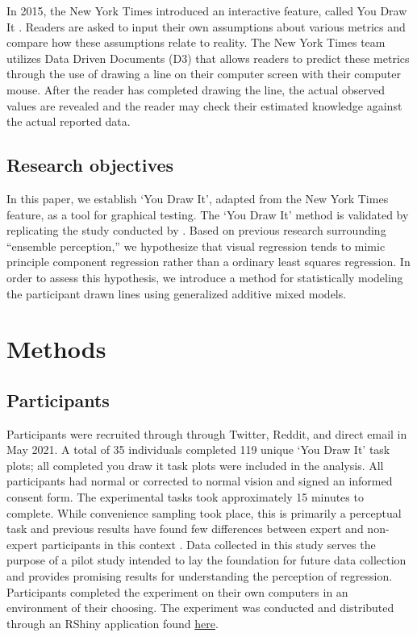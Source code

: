 \documentclass[12pt]{article}
\begin{document}
In 2015, the New York Times introduced an interactive feature, called
You Draw It
\citep{aisch_cox_quealy_2015, buchanan_park_pearce_2017, katz_2017}.
Readers are asked to input their own assumptions about various metrics
and compare how these assumptions relate to reality. The New York Times
team utilizes Data Driven Documents (D3) that allows readers to predict
these metrics through the use of drawing a line on their computer screen
with their computer mouse. After the reader has completed drawing the
line, the actual observed values are revealed and the reader may check
their estimated knowledge against the actual reported data.

\hypertarget{research-objectives}{%
\subsection{Research objectives}\label{research-objectives}}

In this paper, we establish `You Draw It', adapted from the New York
Times feature, as a tool for graphical testing. The `You Draw It' method
is validated by replicating the study conducted by
\citet{mosteller1981eye}. Based on previous research surrounding
``ensemble perception,'' we hypothesize that visual regression tends to
mimic principle component regression rather than a ordinary least
squares regression. In order to assess this hypothesis, we introduce a
method for statistically modeling the participant drawn lines using
generalized additive mixed models.

\hypertarget{methods}{%
\section{Methods}\label{methods}}

\hypertarget{participants}{%
\subsection{Participants}\label{participants}}

Participants were recruited through through Twitter, Reddit, and direct
email in May 2021. A total of 35 individuals completed 119 unique `You
Draw It' task plots; all completed you draw it task plots were included
in the analysis. All participants had normal or corrected to normal
vision and signed an informed consent form. The experimental tasks took
approximately 15 minutes to complete. While convenience sampling took
place, this is primarily a perceptual task and previous results have
found few differences between expert and non-expert participants in this
context \citep{vanderplas2015spatial}. Data collected in this study
serves the purpose of a pilot study intended to lay the foundation for
future data collection and provides promising results for understanding
the perception of regression. Participants completed the experiment on
their own computers in an environment of their choosing. The experiment
was conducted and distributed through an RShiny application found
\href{https://shiny.srvanderplas.com/you-draw-it/}{here}.
\end{document}
